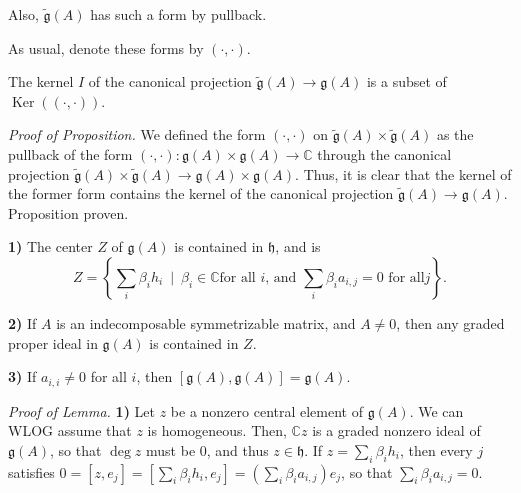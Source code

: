 \documentclass[etingof-lie.tex]{subfiles}
\begin{document}
Also, $\widetilde{\mathfrak{g}}\left(  A\right)  $ has such a form by pullback.

As usual, denote these forms by $\left(  \cdot,\cdot\right)  $.

\begin{proposition}
The kernel $I$ of the canonical projection $\widetilde{\mathfrak{g}}\left(
A\right)  \rightarrow\mathfrak{g}\left(  A\right)  $ is a subset of
$\operatorname*{Ker}\left(  \left(  \cdot,\cdot\right)  \right)  $.
\end{proposition}

\textit{Proof of Proposition.} We defined the form $\left(  \cdot
,\cdot\right)  $ on $\widetilde{\mathfrak{g}}\left(  A\right)  \times
\widetilde{\mathfrak{g}}\left(  A\right)  $ as the pullback of the form
$\left(  \cdot,\cdot\right)  :\mathfrak{g}\left(  A\right)  \times
\mathfrak{g}\left(  A\right)  \rightarrow\mathbb{C}$ through the canonical
projection $\widetilde{\mathfrak{g}}\left(  A\right)  \times
\widetilde{\mathfrak{g}}\left(  A\right)  \rightarrow\mathfrak{g}\left(
A\right)  \times\mathfrak{g}\left(  A\right)  $. Thus, it is clear that the
kernel of the former form contains the kernel of the canonical projection
$\widetilde{\mathfrak{g}}\left(  A\right)  \rightarrow\mathfrak{g}\left(
A\right)  $. Proposition proven.

\begin{lemma}
\textbf{1)} The center $Z$ of $\mathfrak{g}\left(  A\right)  $ is contained in
$\mathfrak{h}$, and is%
\[
Z=\left\{  \sum\limits_{i}\beta_{i}h_{i}\ \mid\ \beta_{i}\in\mathbb{C}\text{
for all }i\text{, and }\sum\limits_{i}\beta_{i}a_{i,j}=0\text{ for all
}j\right\}  .
\]


\textbf{2)} If $A$ is an indecomposable symmetrizable matrix, and $A\neq0$,
then any graded proper ideal in $\mathfrak{g}\left(  A\right)  $ is contained
in $Z$.

\textbf{3)} If $a_{i,i}\neq0$ for all $i$, then $\left[  \mathfrak{g}\left(
A\right)  ,\mathfrak{g}\left(  A\right)  \right]  =\mathfrak{g}\left(
A\right)  $.
\end{lemma}

\textit{Proof of Lemma.} \textbf{1)} Let $z$ be a nonzero central element of
$\mathfrak{g}\left(  A\right)  $. We can WLOG assume that $z$ is homogeneous.
Then, $\mathbb{C}z$ is a graded nonzero ideal of $\mathfrak{g}\left(
A\right)  $, so that $\deg z$ must be $0$, and thus $z\in\mathfrak{h}$. If
$z=\sum\limits_{i}\beta_{i}h_{i}$, then every $j$ satisfies $0=\left[
z,e_{j}\right]  =\left[  \sum\limits_{i}\beta_{i}h_{i},e_{j}\right]  =\left(
\sum\limits_{i}\beta_{i}a_{i,j}\right)  e_{j}$, so that $\sum\limits_{i}%
\beta_{i}a_{i,j}=0$.
\end{document}
